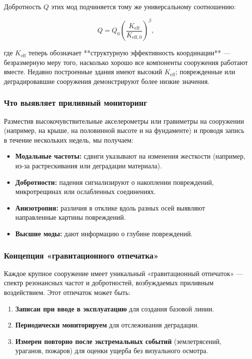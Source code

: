 \documentclass[12pt,a4paper]{article}
\theoremstyle{remark}
\begin{document}
	Добротность \(Q\) этих мод подчиняется тому же универсальному соотношению:
	
	\begin{equation}
		Q = Q_0 \left( \frac{K_{\mathrm{eff}}}{K_{\mathrm{eff},0}} \right)^{\beta},
		\label{eq:structural-Q}
	\end{equation}
	
	где \(K_{\mathrm{eff}}\) теперь обозначает **структурную эффективность координации** — безразмерную меру того, насколько хорошо все компоненты сооружения работают вместе. Недавно построенные здания имеют высокий \(K_{\mathrm{eff}}\); поврежденные или деградировавшие сооружения демонстрируют более низкие значения.
	
	\subsubsection{Что выявляет приливный мониторинг}
	
	Разместив высокочувствительные акселерометры или гравиметры на сооружении (например, на крыше, на половинной высоте и на фундаменте) и проводя запись в течение нескольких недель, мы получаем:
	
	\begin{itemize}
		\item \textbf{Модальные частоты:} сдвиги указывают на изменения жесткости (например, из-за растрескивания или деградации материала).
		\item \textbf{Добротности:} падения сигнализируют о накоплении повреждений, микротрещинах или ослабленных соединениях.
		\item \textbf{Анизотропия:} различия в отклике вдоль разных осей выявляют направленные картины повреждений.
		\item \textbf{Высшие моды:} дают информацию о глубине повреждений.
	\end{itemize}
	
	\subsubsection{Концепция «гравитационного отпечатка»}
	
	Каждое крупное сооружение имеет уникальный «гравитационный отпечаток» — спектр резонансных частот и добротностей, возбуждаемых приливным воздействием. Этот отпечаток может быть:
	\begin{enumerate}
		\item \textbf{Записан при вводе в эксплуатацию} для создания базовой линии.
		\item \textbf{Периодически мониторируем} для отслеживания деградации.
		\item \textbf{Измерен повторно после экстремальных событий} (землетрясений, ураганов, пожаров) для оценки ущерба без визуального осмотра.
	\end{enumerate}
	
\end{document}

